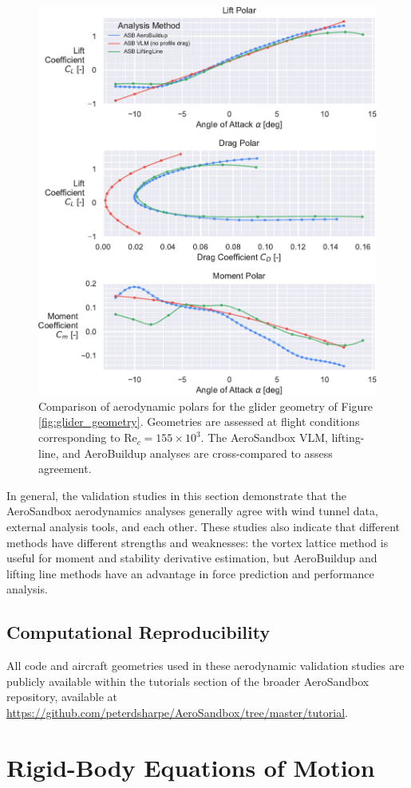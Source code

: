 \begin{figure}[!htb]
    \centering
    \includegraphics[width=\textwidth]{../figures/aero_validation/glider_polars-crop.pdf}
    \caption{Comparison of aerodynamic polars for the glider geometry of Figure \ref{fig:glider_geometry}. Geometries are assessed at flight conditions corresponding to $\text{Re}_c = 155 \times 10^3$. The AeroSandbox VLM, lifting-line, and AeroBuildup analyses are cross-compared to assess agreement.}
    \label{fig:glider_results}
\end{figure}

In general, the validation studies in this section demonstrate that the AeroSandbox aerodynamics analyses generally agree with wind tunnel data, external analysis tools, and each other. These studies also indicate that different methods have different strengths and weaknesses: the vortex lattice method is useful for moment and stability derivative estimation, but AeroBuildup and lifting line methods have an advantage in force prediction and performance analysis.

\subsection{Computational Reproducibility}

All code and aircraft geometries used in these aerodynamic validation studies are publicly available within the tutorials section of the broader AeroSandbox repository, available at \url{https://github.com/peterdsharpe/AeroSandbox/tree/master/tutorial}.


\section{Rigid-Body Equations of Motion}

%

